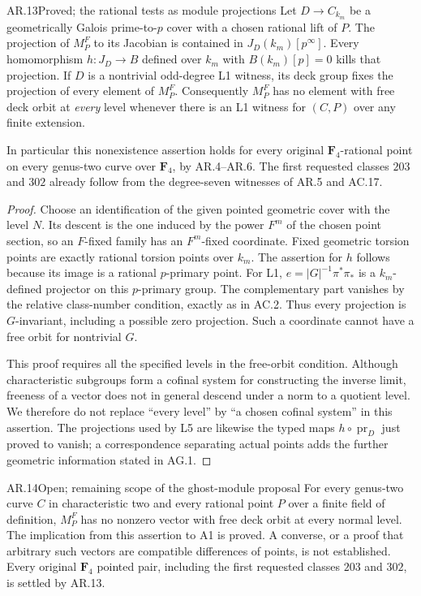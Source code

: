 \begin{claim}{AR.13}{Proved; the rational tests as module projections}
Let $D\to C_{k_m}$ be a geometrically Galois prime-to-$p$ cover with
a chosen rational lift of $P$.  The projection of $M_P^F$ to its
Jacobian is contained in $J_D(k_m)[p^\infty]$.  Every homomorphism
$h:J_D\to B$ defined over $k_m$ with $B(k_m)[p]=0$ kills that
projection.  If $D$ is a nontrivial odd-degree L1 witness, its deck
group fixes the projection of every element of $M_P^F$.
Consequently $M_P^F$ has no element with free deck orbit at
\emph{every} level whenever there is an L1 witness for $(C,P)$
over any finite extension.

In particular this nonexistence assertion holds for every original
$\mathbf F_4$-rational point on every genus-two curve over $\mathbf F_4$,
by AR.4--AR.6. The first requested classes $203$ and $302$ already
follow from the degree-seven witnesses of AR.5 and AC.17.
\end{claim}
\begin{proof}
Choose an identification of the given pointed geometric cover with
the level $N$.  Its descent is the one induced by the power $F^m$
of the chosen point section, so an $F$-fixed family has an
$F^m$-fixed coordinate.  Fixed geometric torsion points are exactly
rational torsion points over $k_m$.  The assertion for $h$ follows
because its image is a rational $p$-primary point.  For L1,
$e=|G|^{-1}\pi^*\pi_*$ is a $k_m$-defined projector on this
$p$-primary group.  The complementary part vanishes by the relative
class-number condition, exactly as in AC.2.  Thus every projection
is $G$-invariant, including a possible zero projection.  Such a
coordinate cannot have a free orbit for nontrivial $G$.

This proof requires all the specified levels in the free-orbit
condition.  Although characteristic subgroups form a cofinal system
for constructing the inverse limit, freeness of a vector does not
in general descend under a norm to a quotient level.  We therefore
do not replace ``every level'' by ``a chosen cofinal system'' in
this assertion.  The projections used by L5 are likewise the typed
maps $h\circ\operatorname{pr}_D$ just proved to vanish; a
correspondence separating actual points adds the further geometric
information stated in AG.1.
\end{proof}

\begin{claim}{AR.14}{Open; remaining scope of the ghost-module proposal}
For every genus-two curve $C$ in characteristic two and every
rational point $P$ over a finite field of definition, $M_P^F$ has no
nonzero vector with free deck orbit at every normal level.
The implication from this assertion to A1 is proved.  A converse,
or a proof that arbitrary such vectors are compatible differences
of points, is not established.  Every original $\mathbf F_4$ pointed pair, including the first
requested classes $203$ and $302$, is settled by AR.13.
\end{claim}

